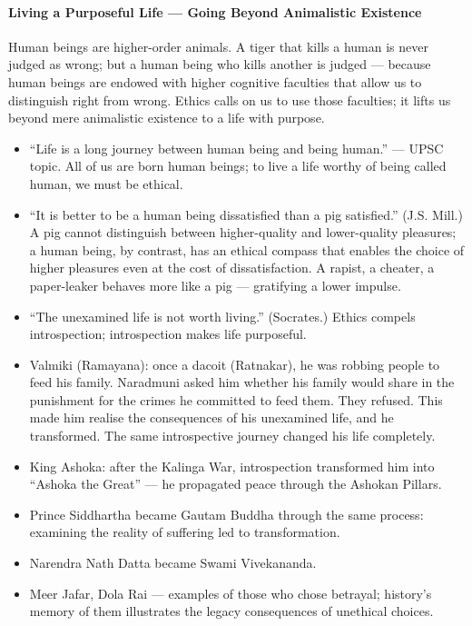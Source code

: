 \paragraph{Living a Purposeful Life --- Going Beyond Animalistic Existence} Human beings are higher-order animals. A tiger that kills a human is never judged as wrong; but a human being who kills another is judged --- because human beings are endowed with higher cognitive faculties that allow us to distinguish right from wrong. Ethics calls on us to use those faculties; it lifts us beyond mere animalistic existence to a life with purpose.

\begin{PYQLink}
\begin{itemize}
\item ``Life is a long journey between human being and being human.'' --- UPSC topic. All of us are born human beings; to live a life worthy of being called human, we must be ethical.
\item ``It is better to be a human being dissatisfied than a pig satisfied.'' (J.S. Mill.) A pig cannot distinguish between higher-quality and lower-quality pleasures; a human being, by contrast, has an ethical compass that enables the choice of higher pleasures even at the cost of dissatisfaction. A rapist, a cheater, a paper-leaker behaves more like a pig --- gratifying a lower impulse.
\item ``The unexamined life is not worth living.'' (Socrates.) Ethics compels introspection; introspection makes life purposeful.
\end{itemize}
\end{PYQLink}

\begin{ExampleBox}
\begin{itemize}
\item Valmiki (Ramayana): once a dacoit (Ratnakar), he was robbing people to feed his family. Naradmuni asked him whether his family would share in the punishment for the crimes he committed to feed them. They refused. This made him realise the consequences of his unexamined life, and he transformed. The same introspective journey changed his life completely.
\item King Ashoka: after the Kalinga War, introspection transformed him into ``Ashoka the Great'' --- he propagated peace through the Ashokan Pillars.
\item Prince Siddhartha became Gautam Buddha through the same process: examining the reality of suffering led to transformation.
\item Narendra Nath Datta became Swami Vivekananda.
\item Meer Jafar, Dola Rai --- examples of those who chose betrayal; history's memory of them illustrates the legacy consequences of unethical choices.
\end{itemize}
\end{ExampleBox}

